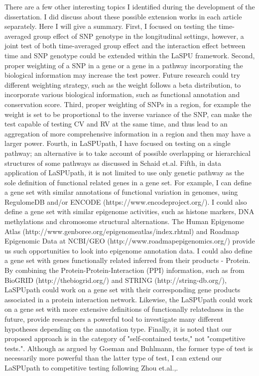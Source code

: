 \documentclass[12pt]{article}
\begin{document}
There are a few other interesting topics I identified during the development of the dissertation. I did discuss about these possible extension works in each article separately. Here I will give a summary. First, I focused on testing the time-averaged group effect of SNP genotype in the longitudinal settings, however, a joint test of both time-averaged group effect and the interaction effect between time and SNP genotype could be extended within the LaSPU framework. Second, proper weighting of a SNP in a gene or a gene in a pathway incorporating the biological information may increase the test power. Future research could try different weighting strategy, such as the weight follows a beta distribution, to incorporate various biological information, such as functional annotation and conservation score. Third, proper weighting of SNPs in a region, for example the weight is set to be proportional to the inverse variance of the SNP, can make the test capable of testing CV and RV at the same time, and thus lead to an aggregation of more comprehensive information in a region and then may have a larger power. Fourth, in LaSPUpath, I have focused on testing on a single pathway; an alternative is to take account of possible overlapping or hierarchical structures of some pathways as discussed in Schaid et.al.\cite{Schaid2012} Fifth, in data application of LaSPUpath, it is not limited to use only genetic pathway as the sole definition of functional related genes in a gene set. For example, I can define a gene set with similar annotations of functional variation in genomes, using RegulomeDB\cite{Boyle2012} and/or ENCODE (https://www.encodeproject.org/). I could also define a gene set with similar epigenome activities, such as histone markers, DNA methylations and chromosome structural alternations. The Human Epigenome Atlas (http://www.genboree.org/epigenomeatlas/index.rhtml) and Roadmap Epigenomic Data at NCBI/GEO (http://www.roadmapepigenomics.org/) provide us such opportunities to look into epigenome annotation data. I could also define a gene set with genes functionally related inferred from their products - Protein. By combining the Protein-Protein-Interaction (PPI) information, such as from BioGRID (http://thebiogrid.org/) and STRING (http://string-db.org/), LaSPUpath could work on a gene set with their corresponding gene products associated in a protein interaction network. Likewise, the LaSPUpath could work on a gene set with more extensive definitions of functionally relatedness in the future, provide researchers a powerful tool to investigate many different hypotheses depending on the annotation type. Finally, it is noted that our proposed approach is in the category of "self-contained tests," not "competitive tests."\cite{Goeman2007,Liu2007,Nam2008,Wang2010,Fridley2010,Fridley2011}. Although as argued by Goeman and Buhlmann,\cite{Goeman2007} the former type of test is necessarily more powerful than the latter type of test, I can extend our LaSPUpath to competitive testing following Zhou et.al.,\cite{Zhou2013}.
\end{document}
